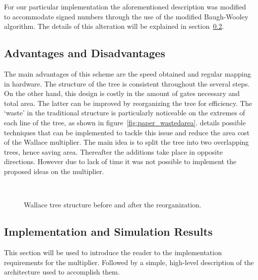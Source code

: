 For our particular implementation the aforementioned description was modified to accommodate signed numbers through the use of the modified Baugh-Wooley algorithm. The details of this alteration will be explained in section~\ref{sec:implementation}.

\subsection{Advantages and Disadvantages}

The main advantages of this scheme are the speed obtained and regular mapping in hardware. The structure of the tree is consistent throughout the several steps. On the other hand, this design is costly in the amount of gates necessary and total area. The latter can be improved by reorganizing the tree for efficiency. The `waste' in the traditional structure is particularly noticeable on the extremes of each line of the tree, as shown in figure~\ref{fig:paper_wastedarea}. \cite{betterwallace} details possible techniques that can be implemented to tackle this issue and reduce the area cost of the Wallace multiplier. The main idea is to split the tree into two overlapping trees, hence saving area. Thereafter the additions take place in opposite directions. 
However due to lack of time it was not possible to implement the proposed ideas on the multiplier.

\begin{figure}[H]
\centering

\\
\caption{Wallace tree structure before and after the reorganization.}
\label{fig:paper}
\end{figure}


\subsection{Implementation and Simulation Results}
\label{sec:implementation}

This section will be used to introduce the reader to the implementation requirements for the multiplier. Followed by a simple, high-level description of the architecture used to accomplish them.

